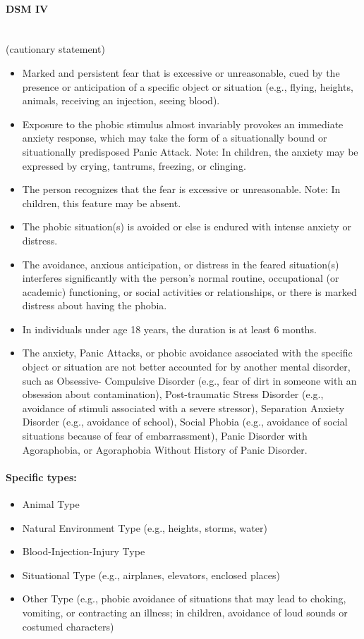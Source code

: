 \documentclass[a4paper,10pt]{article}
\begin{document}
\paragraph{DSM IV}~\\
(cautionary statement) 
\begin{itemize}
\item Marked and persistent fear that is excessive or unreasonable, cued by the presence or anticipation of a specific object or situation (e.g., flying, heights, animals, receiving an
injection, seeing blood). 
\item Exposure to the phobic stimulus almost invariably provokes an immediate anxiety response, which may take the form of a situationally bound or situationally predisposed Panic Attack. 
Note: In children, the anxiety may be expressed by crying, tantrums, freezing, or clinging. 
\item  The person recognizes that the fear is excessive or unreasonable. Note: In children, this feature may be absent. 
\item The phobic situation(s) is avoided or else is endured with intense anxiety or distress. 
\item The avoidance, anxious anticipation, or distress in the feared situation(s) interferes significantly with the person's normal routine, occupational (or academic) functioning, or
social activities or relationships, or there is marked distress about having the phobia. 
\item In individuals under age 18 years, the duration is at least 6 months.
\item The anxiety, Panic Attacks, or phobic avoidance associated with the specific object or situation are not better accounted for by another mental disorder, such as Obsessive-
Compulsive Disorder (e.g., fear of dirt in someone with an obsession about contamination), Post-traumatic Stress Disorder (e.g., avoidance of stimuli associated with a severe stressor),
Separation Anxiety Disorder (e.g., avoidance of school), Social Phobia (e.g., avoidance of social situations because of fear of embarrassment), Panic Disorder with Agoraphobia, or 
Agoraphobia Without History of Panic Disorder. \cite{dsmPhobia}
\end{itemize}



\paragraph{Specific types:} 
\begin{itemize}
\item Animal Type
\item Natural Environment Type (e.g., heights, storms, water) 
\item Blood-Injection-Injury Type 
\item Situational Type (e.g., airplanes, elevators, enclosed places) 
\item Other Type (e.g., phobic avoidance of situations that may lead to choking, vomiting, or contracting an illness; in children, avoidance of loud sounds or costumed characters)
\end{itemize}
\par
\end{document}
